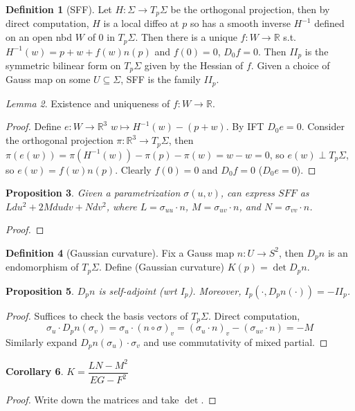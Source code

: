 \documentclass{article}
\theoremstyle{definition}
\newtheorem{defn}{Definition}[section]
\theoremstyle{remark}
\newtheorem{lem}[defn]{Lemma}
\theoremstyle{plain}
\newtheorem{prop}[defn]{Proposition}
\newtheorem{crly}[defn]{Corollary}
\theoremstyle{definition}
\newcommand{\RR}{\mathbb{R}}
\begin{document}
\begin{defn}[SFF]
    Let $H:\Sigma\to T_p\Sigma$ be the orthogonal projection, then by direct computation, $H$ is a local diffeo at $p$ so has a smooth inverse $H^{-1}$ defined on an open nbd $W$ of $0$ in $T_p\Sigma$. Then there is a unique $f:W\to\RR$ s.t. $H^{-1}(w)=p+w+f(w)n(p)$ and $f(0)=0$, $D_0f=0$. Then $II_p$ is the symmetric bilinear form on $T_p\Sigma$ given by the Hessian of $f$. Given a choice of Gauss map on some $U\subseteq\Sigma$, SFF is the family $II_p$.
\end{defn}
\begin{lem}
    Existence and uniqueness of $f:W\to\RR$.
\end{lem}
\begin{proof}
    Define $e:W\to \RR^3$ $w\mapsto H^{-1}(w)-(p+w)$. By IFT $D_0e=0$. Consider the orthogonal projection $\pi:\RR^3\to T_p\Sigma$, then $\pi(e(w))=\pi(H^{-1}(w))-\pi(p)-\pi(w)=w-w=0$, so $e(w)\perp T_p\Sigma$, so $e(w)=f(w)n(p)$. Clearly $f(0)=0$ and $D_0f=0$ ($D_0e=0$).
\end{proof}
\begin{prop}
    Given a parametrization $\sigma(u,v)$, can express $SFF$ as $Ldu^2+2Mdudv+Ndv^2$, where $L=\sigma_{uu}\cdot n$, $M=\sigma_{uv}\cdot n$, and $N=\sigma_{vv}\cdot n$.
\end{prop}
\begin{proof}

\end{proof}
\begin{defn}[Gaussian curvature]
    Fix a Gauss map $n:U\to S^2$, then $D_pn$ is an endomorphism of $T_p\Sigma$. Define (Gaussian curvature) $K(p)=\det D_pn$.
\end{defn}
\begin{prop}
    $D_pn$ is self-adjoint (wrt $I_p$). Moreover, $I_p(\cdot, D_pn(\cdot))=-II_p$.
\end{prop}
\begin{proof}
    Suffices to check the basis vectors of $T_p\Sigma$. Direct computation,
    \[\sigma_u\cdot D_pn(\sigma_v)=\sigma_u\cdot (n\circ\sigma)_v=(\sigma_u\cdot n)_v-(\sigma_{uv}\cdot n)=-M\]
    Similarly expand $D_pn(\sigma_u)\cdot\sigma_v$ and use commutativity of mixed partial.
\end{proof}
\begin{crly}
    $K=\dfrac{LN-M^2}{EG-F^2}$
\end{crly}
\begin{proof}
    Write down the matrices and take $\det$.
\end{proof}
\end{document}
